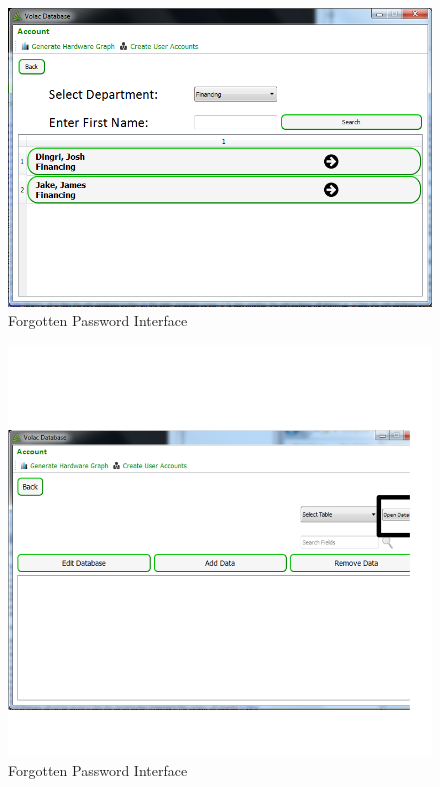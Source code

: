 \begin{figure}[H]
    \includegraphics[width=\textwidth]{./Testing/Images/SearchStaffInterface.png}
    \caption{Forgotten Password Interface} \label{fig:SearchStaffInterface}
\end{figure}

\begin{figure}[H]
    \includegraphics[width=\textwidth]{./Testing/Images/OpenDatabaseFileBefore.png}
    \caption{Forgotten Password Interface} \label{fig:OpenDatabaseFileBefore}
\end{figure}

